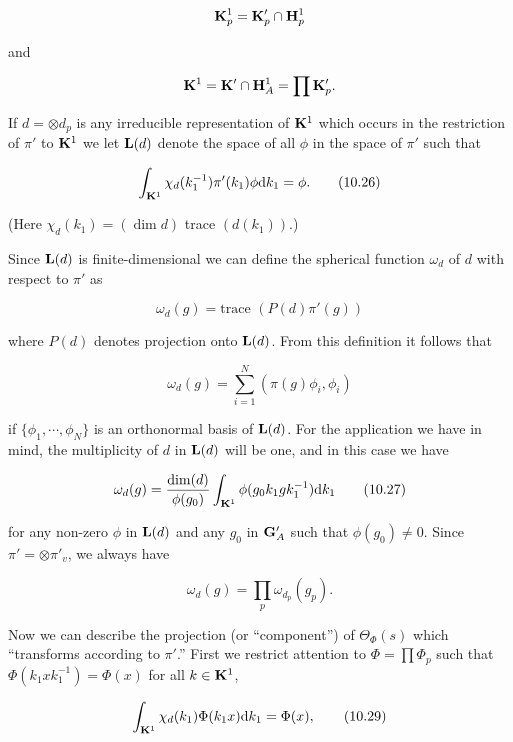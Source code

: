 \[
\mathbf{K}_p^1 = \mathbf{K}'_p \cap \mathbf{H}_p^1
\]

and

\[
\mathbf{K}^1 = \mathbf{K}' \cap \mathbf{H}_A^1 = \prod \mathbf{K}'_p.
\]

If $d = \otimes d_p$ is any irreducible representation of $\mathbf{K}^1$ which occurs in the restriction of $\pi'$ to $\mathbf{K}^1$ we let $\mathbf{L}(d)$ denote the space of all $\phi$ in the space of $\pi'$ such that

\begin{equation}\label{eq:10.26}
\int_{\mathbf{K}^1} \chi_d(k_1^{-1})\pi'(k_1)\phi \mathrm{d} k_1 = \phi.\tag{10.26}
\end{equation}

(Here $\chi_d(k_1) = (\dim d)$ trace $(d(k_1))$.)

Since $\mathbf{L}(d)$ is finite-dimensional we can define the spherical function $\omega_d$ of $d$ with respect to $\pi'$ as

\[
\omega_d(g) = \text{trace } (P(d)\pi'(g))
\]

where $P(d)$ denotes projection onto $\mathbf{L}(d)$. From this definition it follows that

\[
\omega_d(g) = \sum_{i = 1}^{N}(\pi(g)\phi_i, \phi_i)
\]

if $\{\phi_1, \cdots, \phi_N\}$ is an orthonormal basis of $\mathbf{L}(d)$. For the application we have in mind, the multiplicity of $d$ in $\mathbf{L}(d)$ will be one, and in this case we have

\begin{equation}\label{eq:10.27}
\omega_d(g) = \frac{\dim(d)}{\phi(g_0)}\int_{\mathbf{K}^1}\phi(g_0k_1gk_1^{-1}) \mathrm{d} k_1\tag{10.27}
\end{equation}

for any non-zero $\phi$ in $\mathbf{L}(d)$ and any $g_0$ in $\mathbf{G}'_A$ such that $\phi(g_0) \neq 0$. Since $\pi' = \otimes \pi'_v$, we always have

\begin{equation}\label{eq:10.28}
\omega_d(g) = \prod_p \omega_{d_p}(g_p).\tag{10.28}
\end{equation}

Now we can describe the projection (or ``component'') of $\Theta_\Phi(s)$ which ``transforms according to $\pi'$.'' First we restrict attention to $\Phi = \prod \Phi_p$ such that $\Phi(k_1xk_1^{-1}) = \Phi(x)$ for all $k \in \mathbf{K}^1$,

\begin{equation}\label{eq:10.29}
\int_{\mathbf{K}^1} \chi_d(k_1)\Phi(k_1x) \mathrm{d} k_1 = \Phi(x),\tag{10.29}
\end{equation}

